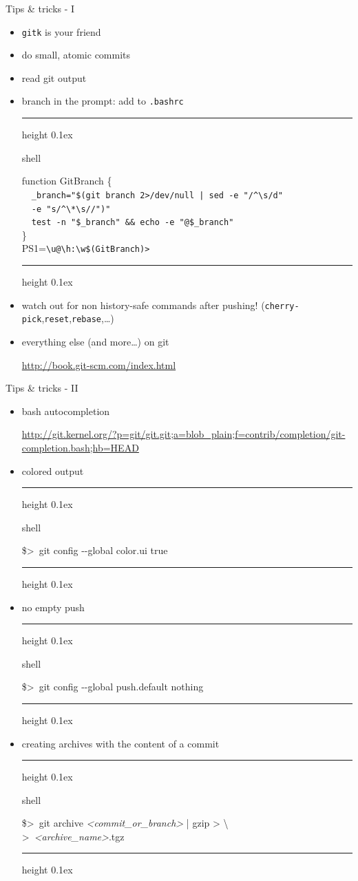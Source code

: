 \documentclass[hyperref={colorlinks}]{beamer}
\newenvironment{shell}{%
\footnotesize\flushleft\hrule height 0.1ex
\tt\begin{beamercolorbox}[sep=1ex,left]{shell}%
}{%
\end{beamercolorbox}
\hrule height 0.1ex
\endflushleft\par
}
\newcommand*{\tshell}[1]{{\usebeamercolor[fg]{shell}\colorbox{bg}{\tt#1}}}
\newcommand*{\psone}[1][ant]{\$>~}
\newcommand*{\nl}{\textbackslash\\>~}
\newcommand*{\var}[1]{{\it<#1>}}
\begin{document}
\begin{frame}[fragile]{Tips \& tricks - I}
\begin{itemize}%
\item \tshell{gitk} is your friend
\item do small, atomic commits
\item read git output
\item branch in the prompt: add to \texttt{.bashrc}
\begin{shell}
\tiny
function GitBranch \{\\
~~\verb!_branch="$(git branch 2>/dev/null | sed -e "/^\s/d"!\\
~~\verb!-e "s/^\*\s//")"!\\
~~\verb!test -n "$_branch" && echo -e "@$_branch"!\\
\}\\
PS1=\textquotesingle\verb!\u@\h:\w$(GitBranch)> !\textquotesingle
\end{shell}
\vspace*{0.25cm}
\item watch out for non history-safe commands after pushing!
{\footnotesize(\tshell{cherry-pick},\texttt{reset},\tshell{rebase},\ldots)}
\item everything else (and more\ldots) on git
\begin{center}
\url{http://book.git-scm.com/index.html}
\end{center}
\end{itemize}
\end{frame}
\begin{frame}{Tips \& tricks - II}
\begin{itemize}%
\item bash autocompletion
\begin{center}
\footnotesize
\url{http://git.kernel.org/?p=git/git.git;a=blob_plain;f=contrib/completion/git-completion.bash;hb=HEAD}
\end{center}
\item colored output
\begin{shell}
\psone git config -{}-global color.ui true
\end{shell}
\vspace*{0.25cm}
\item no empty push
\begin{shell}
\psone git config -{}-global push.default nothing
\end{shell}
\vspace*{0.25cm}
\item creating archives with the content of a commit
\begin{shell}
\psone git archive \var{commit_or_branch} | gzip > \nl \var{archive_name}.tgz
\end{shell}
\end{itemize}
\end{frame}
\end{document}
